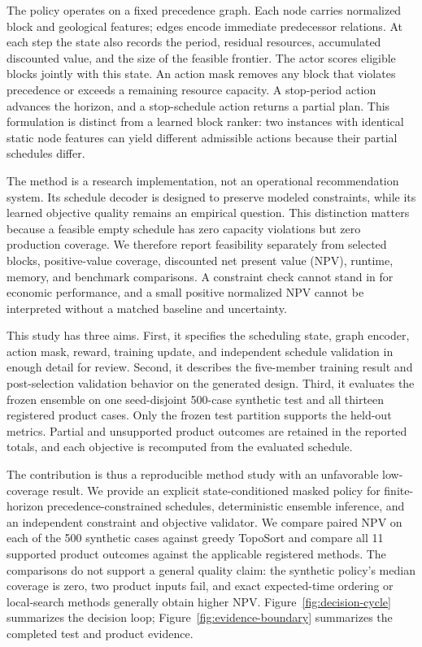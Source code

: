 \documentclass[11pt]{article}
\begin{document}
The policy operates on a fixed precedence graph. Each node carries normalized block and geological features; edges encode immediate predecessor relations. At each step the state also records the period, residual resources, accumulated discounted value, and the size of the feasible frontier. The actor scores eligible blocks jointly with this state. An action mask removes any block that violates precedence or exceeds a remaining resource capacity. A stop-period action advances the horizon, and a stop-schedule action returns a partial plan. This formulation is distinct from a learned block ranker: two instances with identical static node features can yield different admissible actions because their partial schedules differ.

The method is a research implementation, not an operational recommendation system. Its schedule decoder is designed to preserve modeled constraints, while its learned objective quality remains an empirical question. This distinction matters because a feasible empty schedule has zero capacity violations but zero production coverage. We therefore report feasibility separately from selected blocks, positive-value coverage, discounted net present value (NPV), runtime, memory, and benchmark comparisons. A constraint check cannot stand in for economic performance, and a small positive normalized NPV cannot be interpreted without a matched baseline and uncertainty.

This study has three aims. First, it specifies the scheduling state, graph encoder, action mask, reward, training update, and independent schedule validation in enough detail for review. Second, it describes the five-member training result and post-selection validation behavior on the generated design. Third, it evaluates the frozen ensemble on one seed-disjoint 500-case synthetic test and all thirteen registered product cases. Only the frozen test partition supports the held-out metrics. Partial and unsupported product outcomes are retained in the reported totals, and each objective is recomputed from the evaluated schedule.

The contribution is thus a reproducible method study with an unfavorable low-coverage result. We provide an explicit state-conditioned masked policy for finite-horizon precedence-constrained schedules, deterministic ensemble inference, and an independent constraint and objective validator. We compare paired NPV on each of the 500 synthetic cases against greedy TopoSort and compare all 11 supported product outcomes against the applicable registered methods. The comparisons do not support a general quality claim: the synthetic policy's median coverage is zero, two product inputs fail, and exact expected-time ordering or local-search methods generally obtain higher NPV. Figure~\ref{fig:decision-cycle} summarizes the decision loop; Figure~\ref{fig:evidence-boundary} summarizes the completed test and product evidence.
\end{document}
